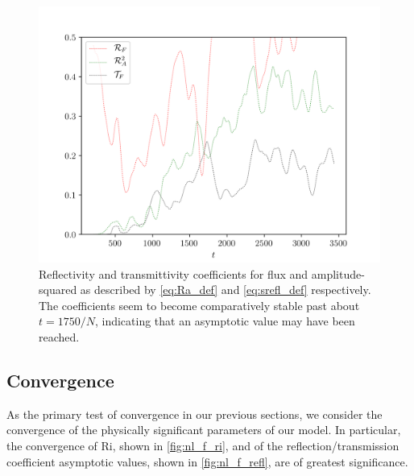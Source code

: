 \documentclass[
        fleqn,
        usenatbib,
    ]{mnras}
\begin{document}
\begin{figure}
    \centering
    \includegraphics[width=\columnwidth]{plots/nl_f_refl.png}
    \caption{Reflectivity and transmittivity coefficients for flux and
    amplitude-squared as described by \autoref{eq:Ra_def} and
    \autoref{eq:srefl_def} respectively. The coefficients seem to become
    comparatively stable past about $t = 1750/N$, indicating that an asymptotic
    value may have been reached.}\label{fig:nl_f_refl}
\end{figure}

\subsection{Convergence}\label{ss:convergence}

As the primary test of convergence in our previous sections, we consider the
convergence of the physically significant parameters of our model. In
particular, the convergence of $\mathrm{Ri}$, shown in \autoref{fig:nl_f_ri},
and of the reflection/transmission coefficient asymptotic values, shown in
\autoref{fig:nl_f_refl}, are of greatest significance.
\end{document}
